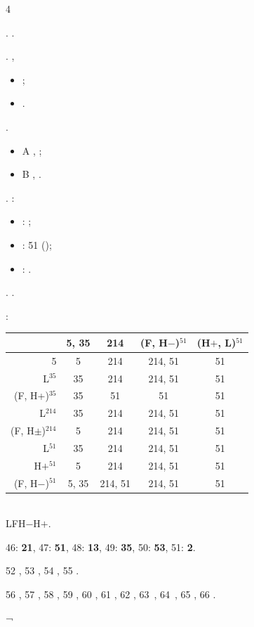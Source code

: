 \begin{assgts}\setcounter{enumi}4
\item \mandcomp.
.

\dejaknow. \whenrest,
%
\begin{itemize}
\item {};
\item {}.
\end{itemize}
%
\usethese {\inmandar}. \keredomo
%
\begin{itemize}
\item \onsetcis A{\palatals} , \indeterx {\acconset};
\item \onsetcis B{\retrofs} \onsetane, \indeterx {\accrhyme}.
\end{itemize}
%
\item \vocanton. \mandtone:
%
\begin{itemize}
\item \risetone: ;
\item \flattone: 51 (\alwaysso);
\item \falltone: .
\end{itemize}
%
\decontur. \voidevel {\falltone}{\flattone\ \au\ \risetone}.

\somanton {\inmandar}:\medskip \\
%
\begin{tabular}{|r||c|c|c|c|}\hline
& 5, 35 & 214 & (F, H$-$)$^{51}$ & (H$+$, L)$^{51}$ \\\hline\hline
5 & 5 & 214 & 214, 51 & 51 \\\hline
\hline
L$^{35}$ & 35 & 214 & 214, 51 & 51 \\\hline
(F, H+)$^{35}$ & 35 & 51 & 51 & 51 \\\hline
\hline
L$^{214}$ & 35 & 214 & 214, 51 & 51 \\\hline
(F, H$\pm$)$^{214}$ & 5 & 214 & 214, 51 & 51 \\\hline
\hline
L$^{51}$ & 35 & 214 & 214, 51 & 51 \\\hline
H$+{}^{51}$ & 5 & 214 & 214, 51 & 51 \\\hline
(F, H$-$)$^{51}$ & 5, 35 & 214, 51 & 214, 51 & 51 \\\hline
\end{tabular}
\medskip \\
%
\legecons LF{H$-$}{H$+$}. \dimanton
%
\item \rarethat
%
\item 46: \textbf{21}, 47: \textbf{51}, 48: \textbf{13}, 49: \textbf{35}, 50: \textbf{53}, 51: \textbf{2}.
%
\item 52 , 53 , 54 , 55 .
%
\item 56 , 57 , 58 , 59 , 60 , 61 , 62 , 63~, 64~, 65 , 66 .
\end{assgts}
¬
